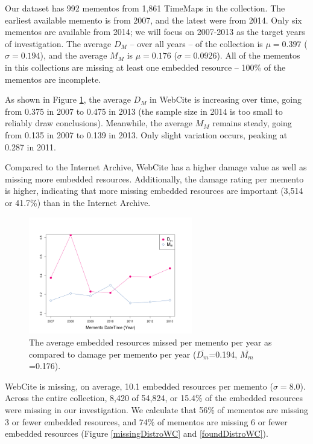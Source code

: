 Our dataset has 992 mementos from 1,861 TimeMaps in the collection. The earliest available memento is from 2007, and the latest were from 2014. Only six mementos are available from 2014; we will focus on 2007-2013 as the target years of investigation. The average $D_M$ -- over all years -- of the collection is $\mu=0.397$ ($\sigma=0.194$), and the average  $M_M$ is $\mu=0.176$ ($\sigma=0.0926$). All of the mementos in this collections are missing at least one embedded resource -- 100\% of the mementos are incomplete. 

As shown in Figure \ref{missingByYearWC}, the average $D_M$ in WebCite is increasing over time, going from 0.375 in 2007 to 0.475 in 2013 (the sample size in 2014 is too small to reliably draw conclusions). Meanwhile, the average $M_M$ remains steady, going from 0.135 in 2007 to 0.139 in 2013. Only slight variation occurs, peaking at 0.287 in 2011. 

Compared to the Internet Archive, WebCite has a higher damage value as well as missing more embedded resources. Additionally, the damage rating per memento is higher, indicating that more missing embedded resources are important (3,514 or 41.7\%) than in the Internet Archive.

\begin{figure}[h!]
\includegraphics[width=270px]{./imgs/MissedAndDamagePerYear_webcite.png}
\caption{The average embedded resources missed per memento per year as compared to damage per memento per year ($\overline{D_m}$=0.194, $\overline{M_m}$=0.176).}
\label{missingByYearWC}
\end{figure}

WebCite is missing, on average, 10.1 embedded resources per memento ($\sigma=8.0$). Across the entire collection, 8,420 of 54,824, or 15.4\% of the embedded resources were missing in our investigation. We calculate that 56\% of mementos are missing 3 or fewer embedded resources, and 74\% of mementos are missing 6 or fewer embedded resources (Figure \ref{missingDistroWC} and \ref{foundDistroWC}).

